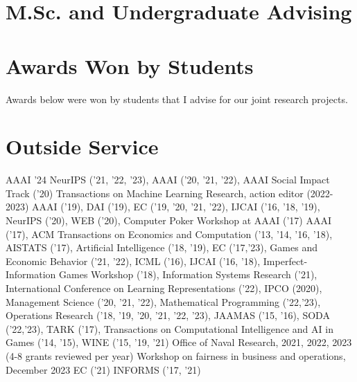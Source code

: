 \documentclass[11pt,a4paper,sans]{moderncv}        %
\begin{document}
\section{M.Sc. and Undergraduate Advising}

\section{Awards Won by Students}
Awards below were won by students that I advise for our joint research projects.


\section{Outside Service}
{
  AAAI '24
}
{
  NeurIPS ('21, '22, '23),
  AAAI ('20, '21, '22),
  AAAI Social Impact Track ('20)
}
{
  Transactions on Machine Learning Research, action editor (2022-2023)
}
{
  AAAI ('19),
  DAI ('19),
  EC ('19, '20, '21, '22),
  IJCAI ('16, '18, '19),
  NeurIPS ('20),
  WEB ('20),
  Computer Poker Workshop at AAAI ('17)
}
{
  AAAI ('17),
  ACM Transactions on Economics and Computation ('13, '14, '16, '18),
  AISTATS ('17),
  Artificial Intelligence ('18, '19),
  EC ('17,'23),
  Games and Economic Behavior ('21, '22),
  ICML ('16),
  IJCAI ('16, '18),
  Imperfect-Information Games Workshop ('18),
  Information Systems Research ('21),
  International Conference on Learning Representations ('22),
  IPCO (2020),
  Management Science ('20, '21, '22),
  Mathematical Programming ('22,'23),
  Operations Research ('18, '19, '20, '21, '22, '23),
  JAAMAS ('15, '16),
  SODA ('22,'23),
  TARK ('17),
  Transactions on Computational Intelligence and AI in Games ('14, '15),
  WINE ('15, '19, '21)
}
{
  Office of Naval Research, 2021, 2022, 2023 (4-8 grants reviewed per year)
}
{
  Workshop on fairness in business and operations, December 2023
}
{
  EC ('21)
  INFORMS ('17, '21)
}
\end{document}
